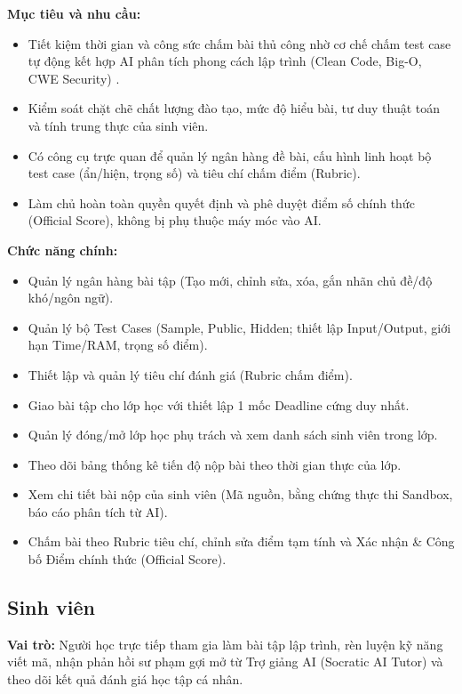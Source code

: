 \documentclass[12pt,a4paper,oneside]{report}
\begin{document}
\noindent\textbf{Mục tiêu và nhu cầu:}
\begin{itemize}
  \item Tiết kiệm thời gian và công sức chấm bài thủ công nhờ cơ chế chấm test case tự động kết hợp AI phân tích phong cách lập trình (Clean Code, Big-O, CWE Security) \cite{combefis2022automated, kuo2022study}.
  \item Kiểm soát chặt chẽ chất lượng đào tạo, mức độ hiểu bài, tư duy thuật toán và tính trung thực của sinh viên.
  \item Có công cụ trực quan để quản lý ngân hàng đề bài, cấu hình linh hoạt bộ test case (ẩn/hiện, trọng số) và tiêu chí chấm điểm (Rubric).
  \item Làm chủ hoàn toàn quyền quyết định và phê duyệt điểm số chính thức (Official Score), không bị phụ thuộc máy móc vào AI.
\end{itemize}

\noindent\textbf{Chức năng chính:}
\begin{itemize}
  \item Quản lý ngân hàng bài tập (Tạo mới, chỉnh sửa, xóa, gắn nhãn chủ đề/độ khó/ngôn ngữ).
  \item Quản lý bộ Test Cases (Sample, Public, Hidden; thiết lập Input/\allowbreak Output, giới hạn Time/\allowbreak RAM, trọng số điểm).
  \item Thiết lập và quản lý tiêu chí đánh giá (Rubric chấm điểm).
  \item Giao bài tập cho lớp học với thiết lập 1 mốc Deadline cứng duy nhất.
  \item Quản lý đóng/mở lớp học phụ trách và xem danh sách sinh viên trong lớp.
  \item Theo dõi bảng thống kê tiến độ nộp bài theo thời gian thực của lớp.
  \item Xem chi tiết bài nộp của sinh viên (Mã nguồn, bằng chứng thực thi Sandbox, báo cáo phân tích từ AI).
  \item Chấm bài theo Rubric tiêu chí, chỉnh sửa điểm tạm tính và Xác nhận \& Công bố Điểm chính thức (Official Score).
\end{itemize}

\subsection{Sinh viên}
\textbf{Vai trò:} Người học trực tiếp tham gia làm bài tập lập trình, rèn luyện kỹ năng viết mã, nhận phản hồi sư phạm gợi mở từ Trợ giảng AI (Socratic AI Tutor) và theo dõi kết quả đánh giá học tập cá nhân.
\end{document}
